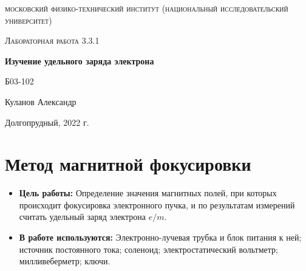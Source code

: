 \documentclass[a4paper, 12pt]{article}
\begin{document}
\begin{titlepage}
	\centering
	\vspace{5cm}
	{\scshape\LARGE московский физико-технический институт (национальный исследовательский университет) \par}
	\vspace{6cm}
	{\scshape\Large Лабораторная работа 3.3.1 \par}
	{\huge\bfseries Изучение удельного заряда электрона \par}
	\vspace{1cm}
	\vfill
\begin{flushright}
	{\large Б03-102}\par
	\vspace{0.3cm}
	{\LARGE Куланов Александр}
\end{flushright}
	

	\vfill


	Долгопрудный, 2022 г.
\end{titlepage}

\section{Метод магнитной фокусировки}

\begin{itemize}
	\item \textbf{Цель работы:} Определение значения магнитных полей, при которых происходит фокусировка электронного пучка, и по результатам измерений считать удельный заряд электрона $e/m$.
    \item \textbf{В работе используются:} Электронно-лучевая трубка и блок питания к ней; источник постоянного тока; соленоид; электростатический вольтметр; милливеберметр; ключи.
\end{itemize}
\end{document}
